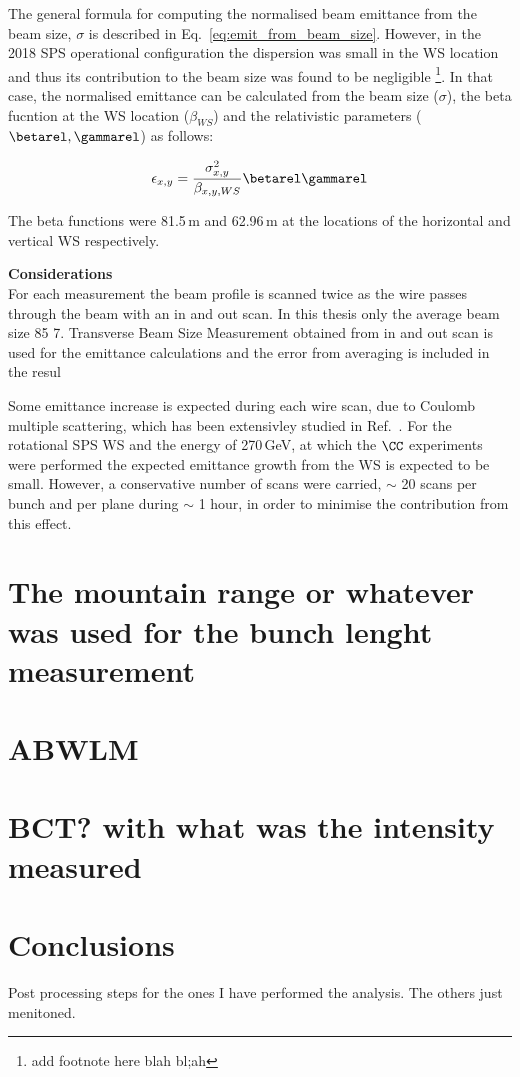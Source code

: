 The general formula for computing the normalised beam emittance from the beam size, $\sigma$ is described in Eq.~\ref{eq:emit_from_beam_size}. However, in the 2018 SPS operational configuration the dispersion was small in the WS location and thus its contribution to the beam size was found to be negligible \footnote{add footnote here blah bl;ah}. In that case, the normalised emittance can be calculated  from the beam size ($\sigma$), the beta fucntion at the WS location ($\beta_{WS}$) and the relativistic parameters ($\betarel, \gammarel$) as follows:

\begin{equation}\label{eq:emittance_from_WS}
   \epsilon_{x,y} = \frac{\sigma_{x,y}^2}{\beta_{x,y, WS}} \betarel \gammarel
\end{equation}

The beta functions were 81.5\,m and 62.96\,m at the locations of the horizontal and vertical WS respectively.


\normalsize{\textbf{Considerations}}\\
   For each measurement the beam profile is scanned twice as the wire passes
   through the beam with an in and out scan. In this thesis only the average beam size
   85
   7. Transverse Beam Size Measurement
   obtained from in and out scan is used for the emittance calculations and the error
   from averaging is included in the resul

Some emittance increase is expected during each wire scan, due to Coulomb multiple scattering, which has been extensivley studied in Ref.~\cite{Roncarolo:1481835}. For the rotational SPS WS and the energy of 270\,GeV, at which the $\CC$ experiments were performed the expected emittance growth from the WS is expected to be small. However, a conservative number of scans were carried, $\sim$ 20 scans per bunch and per plane during $\sim$ 1 hour, in order to minimise the contribution from this effect.

\section{The mountain range or whatever was used for the bunch lenght measurement}

\section{ABWLM}

\section{BCT? with what was the intensity measured}

\section{Conclusions}

Post processing steps for the ones I have performed the analysis. The others just menitoned.
